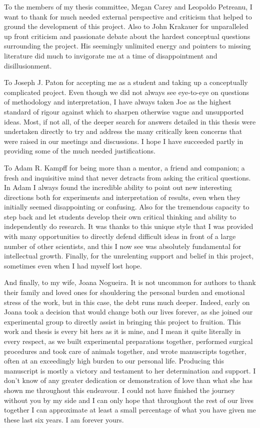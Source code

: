 To the members of my thesis committee, Megan Carey and Leopoldo Petreanu, I want to thank for much needed external perspective and criticism that helped to ground the development of this project. Also to John Krakauer for unparalleled up front criticism and passionate debate about the hardest conceptual questions surrounding the project. His seemingly unlimited energy and pointers to missing literature did much to invigorate me at a time of disappointment and disillusionment.

To Joseph J. Paton for accepting me as a student and taking up a conceptually complicated project. Even though we did not always see eye-to-eye on questions of methodology and interpretation, I have always taken Joe as the highest standard of rigour against which to sharpen otherwise vague and unsupported ideas. Most, if not all, of the deeper search for answers detailed in this thesis were undertaken directly to try and address the many critically keen concerns that were raised in our meetings and discussions. I hope I have succeeded partly in providing some of the much needed justifications.

To Adam R. Kampff for being more than a mentor, a friend and companion; a fresh and inquisitive mind that never detracts from asking the critical questions. In Adam I always found the incredible ability to point out new interesting directions both for experiments and interpretation of results, even when they initially seemed disappointing or confusing. Also for the tremendous capacity to step back and let students develop their own critical thinking and ability to independently do research. It was thanks to this unique style that I was provided with many opportunities to directly defend difficult ideas in front of a large number of other scientists, and this I now see was absolutely fundamental for intellectual growth. Finally, for the unrelenting support and belief in this project, sometimes even when I had myself lost hope.

And finally, to my wife, Joana Nogueira. It is not uncommon for authors to thank their family and loved ones for shouldering the personal burden and emotional stress of the work, but in this case, the debt runs much deeper. Indeed, early on Joana took a decision that would change both our lives forever, as she joined our experimental group to directly assist in bringing this project to fruition. This work and thesis is every bit hers as it is mine, and I mean it quite literally in every respect, as we built experimental preparations together, performed surgical procedures and took care of animals together, and wrote manuscripts together, often at an exceedingly high burden to our personal life. Producing this manuscript is mostly a victory and testament to her determination and support. I don't know of any greater dedication or demonstration of love than what she has shown me throughout this endeavour. I could not have finished the journey without you by my side and I can only hope that throughout the rest of our lives together I can approximate at least a small percentage of what you have given me these last six years. I am forever yours.
